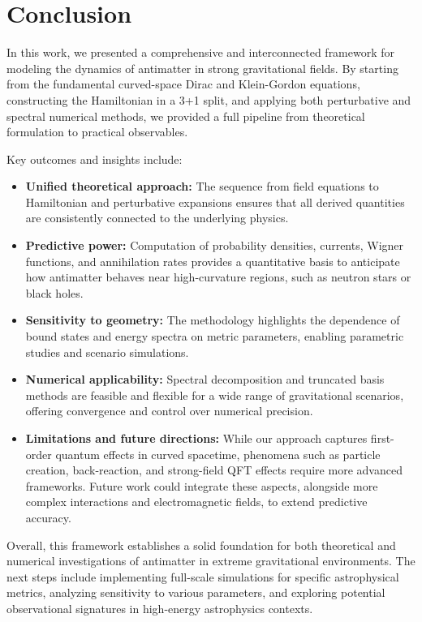 \documentclass[12pt,a4paper]{article}
\begin{document}
\section{Conclusion }
In this work, we presented a comprehensive and interconnected framework for modeling the dynamics of antimatter in strong gravitational fields. By starting from the fundamental curved-space Dirac and Klein-Gordon equations, constructing the Hamiltonian in a 3+1 split, and applying both perturbative and spectral numerical methods, we provided a full pipeline from theoretical formulation to practical observables.

Key outcomes and insights include:
\begin{itemize}
    \item \textbf{Unified theoretical approach:} The sequence from field equations to Hamiltonian and perturbative expansions ensures that all derived quantities are consistently connected to the underlying physics.
    \item \textbf{Predictive power:} Computation of probability densities, currents, Wigner functions, and annihilation rates provides a quantitative basis to anticipate how antimatter behaves near high-curvature regions, such as neutron stars or black holes.
    \item \textbf{Sensitivity to geometry:} The methodology highlights the dependence of bound states and energy spectra on metric parameters, enabling parametric studies and scenario simulations.
    \item \textbf{Numerical applicability:} Spectral decomposition and truncated basis methods are feasible and flexible for a wide range of gravitational scenarios, offering convergence and control over numerical precision.
    \item \textbf{Limitations and future directions:} While our approach captures first-order quantum effects in curved spacetime, phenomena such as particle creation, back-reaction, and strong-field QFT effects require more advanced frameworks. Future work could integrate these aspects, alongside more complex interactions and electromagnetic fields, to extend predictive accuracy.
\end{itemize}

Overall, this framework establishes a solid foundation for both theoretical and numerical investigations of antimatter in extreme gravitational environments. The next steps include implementing full-scale simulations for specific astrophysical metrics, analyzing sensitivity to various parameters, and exploring potential observational signatures in high-energy astrophysics contexts.
\end{document}
